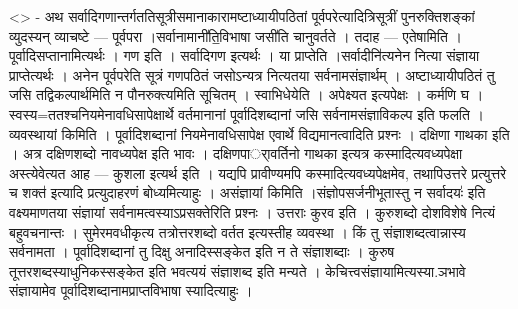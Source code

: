 \textless{}\textgreater{} - अथ
सर्वादिगणान्तर्गततिसूत्रीसमानाकारामष्टाध्यायीपठितां
पूर्वपरेत्यादित्रिसूत्रीं पुनरुक्तिशङ्कां व्युदस्यन् व्याचष्टे ---
पूर्वपरा ।सर्वानामानी॑ति॒विभाषा जसी॑ति चानुवर्तते । तदाह --- एतेषामिति ।
पूर्वादिसप्तानामित्यर्थः । गण इति । सर्वादिगण इत्यर्थः । या प्राप्तेति
।सर्वादीनि॑त्यनेन नित्या संज्ञाया प्राप्तेत्यर्थः । अनेन पूर्वपरेति
सूत्रं गणपठितं जसोऽन्यत्र नित्यतया सर्वनामसंज्ञार्थम् । अष्टाध्यायीपठितं
तु जसि तद्विकल्पार्थमिति न पौनरुक्त्यमिति सूचितम् । स्वाभिधेयेति ।
अपेक्ष्यत इत्यपेक्षः । कर्मणि घ । स्वस्य=ततश्चनियमेनावधिसापेक्षार्थे
वर्तमानानां पूर्वादिशब्दानां जसि सर्वनामसंज्ञाविकल्प इति फलति ।
व्यवस्थायां किमिति । पूर्वादिशब्दानां नियमेनावधिसापेक्ष एवार्थे
विद्यमानत्वादिति प्रश्नः । दक्षिणा गाथका इति । अत्र दक्षिणशब्दो
नावध्यपेक्ष इति भावः । दक्षिणपार्ावर्तिनो गाथका इत्यत्र
कस्मादित्यवध्यपेक्षा अस्त्येवेत्यत आह --- कुशला इत्यर्थ इति । यद्यपि
प्रावीण्यमपि कस्मादित्यवध्यपेक्षमेव, तथापिउत्तरे प्रत्युत्तरे च शक्त॑
इत्यादि प्रत्युदाहरणं बोध्यमित्याहुः । असंज्ञायां किमिति
।संज्ञोपसर्जनीभूतास्तु न सर्वादयः॑ इति वक्ष्यमाणतया संज्ञायां
सर्वनामत्वस्याऽप्रसक्तेरिति प्रश्नः । उत्तराः कुरव इति । कुरुशब्दो
दोशविशेषे नित्यं बहुवचनान्तः । सुमेरमवधीकृत्य तत्रोत्तरशब्दो वर्तत
इत्यस्तीह व्यवस्था । किं तु संज्ञाशब्दत्वान्नास्य सर्वनामता ।
पूर्वादिशब्दानां तु दिक्षु अनादिस्सङ्केत इति न ते संज्ञाशब्दाः । कुरुष
तूत्तरशब्दस्याधुनिकस्सङ्केत इति भवत्ययं संज्ञाशब्द इति मन्यते ।
केचित्त्वसंज्ञायामित्यस्या.ञभावे संज्ञायामेव
पूर्वादिशब्दानामप्राप्तविभाषा स्यादित्याहुः ।
